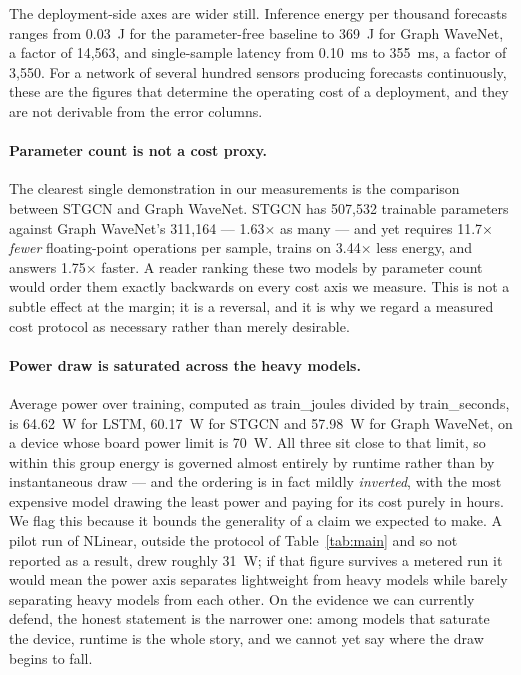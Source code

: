 \documentclass[manuscript,screen,review]{acmart}
\begin{document}
The deployment-side axes are wider still. Inference energy per thousand
forecasts ranges from 0.03~J for the parameter-free baseline to 369~J for
Graph WaveNet, a factor of 14,563, and single-sample latency from 0.10~ms to
355~ms, a factor of 3,550. For a network of several hundred sensors producing
forecasts continuously, these are the figures that determine the operating
cost of a deployment, and they are not derivable from the error columns.

\paragraph{Parameter count is not a cost proxy.} The clearest single
demonstration in our measurements is the comparison between STGCN and Graph
WaveNet. STGCN has 507,532 trainable parameters against Graph WaveNet's
311,164 --- 1.63$\times$ as many --- and yet requires 11.7$\times$
\emph{fewer} floating-point operations per sample, trains on 3.44$\times$ less
energy, and answers 1.75$\times$ faster. A reader ranking these two models by
parameter count would order them exactly backwards on every cost axis we
measure. This is not a subtle effect at the margin; it is a reversal, and it
is why we regard a measured cost protocol as necessary rather than merely
desirable.

\paragraph{Power draw is saturated across the heavy models.} Average power
over training, computed as train\_joules divided by train\_seconds, is
64.62~W for LSTM, 60.17~W for STGCN and 57.98~W for Graph WaveNet, on a
device whose board power limit is 70~W. All three sit close to that limit, so
within this group energy is governed almost entirely by runtime rather than
by instantaneous draw --- and the ordering is in fact mildly \emph{inverted},
with the most expensive model drawing the least power and paying for its cost
purely in hours. We flag this because it bounds the generality of a claim we
expected to make. A pilot run of NLinear, outside the protocol of
Table~\ref{tab:main} and so not reported as a result, drew roughly 31~W;
if that figure survives a metered run it would mean the power axis separates
lightweight from heavy models while barely separating heavy models from each
other. On the evidence we can currently defend, the honest statement is the
narrower one: among models that saturate the device, runtime is the whole
story, and we cannot yet say where the draw begins to fall.
\end{document}
